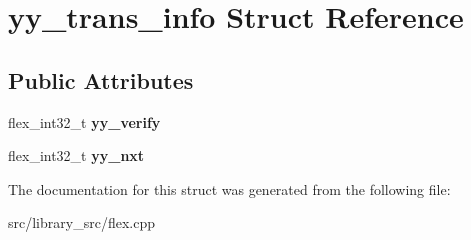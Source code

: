 \hypertarget{structyy__trans__info}{}\section{yy\+\_\+trans\+\_\+info Struct Reference}
\label{structyy__trans__info}
\subsection*{Public Attributes}
\begin{DoxyCompactItemize}
\item 
flex\+\_\+int32\+\_\+t {\bfseries yy\+\_\+verify}\hypertarget{structyy__trans__info_a5c9f61e770deef50bd4e697310342fe9}{}\label{structyy__trans__info_a5c9f61e770deef50bd4e697310342fe9}

\item 
flex\+\_\+int32\+\_\+t {\bfseries yy\+\_\+nxt}\hypertarget{structyy__trans__info_ae0715250c2bef261e596e77e0030f13e}{}\label{structyy__trans__info_ae0715250c2bef261e596e77e0030f13e}

\end{DoxyCompactItemize}


The documentation for this struct was generated from the following file\+:\begin{DoxyCompactItemize}
\item 
src/library\+\_\+src/flex.\+cpp\end{DoxyCompactItemize}
